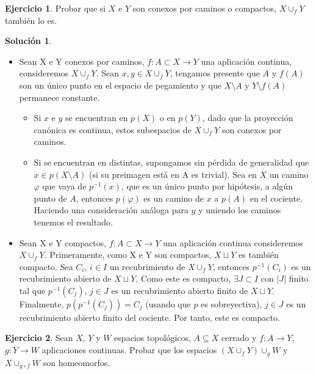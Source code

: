 \documentclass{article}
\theoremstyle{plain}
\theoremstyle{definition}
\newtheorem{exercise}{Ejercicio}
\newtheorem*{sol*}{Solución}
\begin{document}
\newpage
\begin{exercise}
Probar que si $X$ e $Y$ son conexos por caminos o compactos, $X \cup_f Y$ también lo es.
\end{exercise}
\begin{sol*}\mbox{}
\begin{itemize}
\item Sean X e Y conexos por caminos, $f:A\subset X\to Y$ una aplicación continua, consideremos $X \cup_f Y$. Sean $x,y\in X \cup_f Y$, tengamos presente que $A$ y $f(A)$ son un único punto en el espacio de pegamiento y que $X\setminus A$ y $Y\setminus f(A)$ permanece constante.
\begin{itemize}
\item Si $x$ e $y$ se encuentran en $p(X)$ o en $p(Y)$, dado que la proyección canónica es continua, estos subespacios de $X \cup_f Y$ son conexos por caminos.
\item Si se encuentran en distintas, supongamos sin pérdida de generalidad que $x\in p(X\setminus A)$ (si su preimagen está en A es trivial). Sea en $X$ un camino $\varphi$ que vaya de $p^{-1}(x)$, que es un único punto por hipótesis, a algún punto de $A$, entonces $p(\varphi)$ es un camino de $x$ a $p(A)$ en el cociente. Haciendo una consideración análoga para $y$ y uniendo los caminos tenemos el resultado.
\end{itemize}
\item Sean X e Y compactos, $f:A\subset X\to Y$ una aplicación continua consideremos $X \cup_f Y$. Primeramente, como X e Y son compactos, $X\sqcup Y$ es también compacto. Sea $C_i$, $i\in I$ un recubrimiento de $X \cup_f Y$, entonces $p^{-1}(C_i)$ es un recubrimiento abierto de $X\sqcup Y$. Como este es compacto, $\exists J \subset I$ con $|J|$ finito tal que $p^{-1}(C_j)$, $j\in J$ es un recubrimiento abierto finito de $X\sqcup Y$. Finalmente, $p(p^{-1}(C_j))=C_j$ (usando que $p$ es sobreyectiva), $j\in J$ es un recubrimiento abierto finito del cociente. Por tanto, este es compacto.
\end{itemize}
\end{sol*}


\newpage
\begin{exercise}
Sean $X$, $Y$ y $W$ espacios topológicos, $A \subseteq X$ cerrado y $f : A \to Y$, $g : Y \to W$ aplicaciones continuas. Probar que los espacios $(X \cup_f Y) \cup_g W$ y $X \cup _{g \circ f} W$ son homeomorfos.
\end{exercise}
\end{document}
